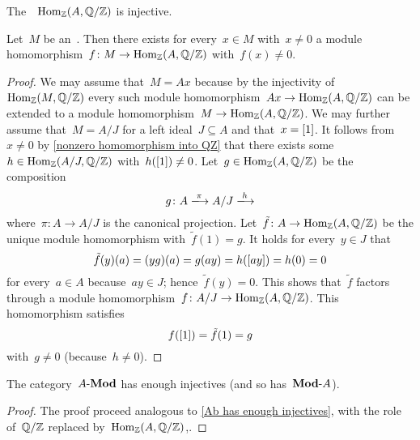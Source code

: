 \begin{example*}
  The~{}~$\operatorname{Hom}_{\mathbb{Z}}(A, \mathbb{Q}/\mathbb{Z})$ is injective.
\end{example*}


\begin{lemma*}
  Let~$M$ be an~{}.
  Then there exists for every~$x \in M$ with~$x \neq 0$ a module homomorphism~$f \colon M \to \operatorname{Hom}_{\mathbb{Z}}(A, \mathbb{Q}/\mathbb{Z})$ with~$f(x) \neq 0$.
\end{lemma*}


\begin{proof}
  We may assume that~$M = A x$ because by the injectivity of~$\operatorname{Hom}_{\mathbb{Z}}(M, \mathbb{Q}/\mathbb{Z})$ every such module homomorphism~$Ax \to \operatorname{Hom}_{\mathbb{Z}}(A, \mathbb{Q}/\mathbb{Z})$ can be extended to a module homomorphism~$M \to \operatorname{Hom}_{\mathbb{Z}}(A, \mathbb{Q}/\mathbb{Z})$.
  We may further assume that~$M = A/J$ for a left ideal~$J \subseteq A$ and that~$x = [1]$.
  It follows from~$x \neq 0$ by \cref{nonzero homomorphism into QZ} that there exists some~$h \in \operatorname{Hom}_{\mathbb{Z}}(A/J, \mathbb{Q}/\mathbb{Z})$ with~$h([1]) \neq 0$.
  Let~$g \in \operatorname{Hom}_{\mathbb{Z}}(A, \mathbb{Q}/\mathbb{Z})$ be the composition
  \[
    g
    \colon
    A
    \xlongto{\pi}
    A/J
    \xlongto{h}
  \]
  where~$\pi \colon A \to A/J$ is the canonical projection.
  Let~$\tilde{f} \colon A \to \operatorname{Hom}_{\mathbb{Z}}(A, \mathbb{Q}/\mathbb{Z})$ be the unique module homomorphism with~$\tilde{f}(1) = g$.
  It holds for every~$y \in J$ that
  \[
    \tilde{f}(y)(a)
    =
    (y g)(a)
    =
    g(ay)
    =
    h([ay])
    =
    h(0)
    =
    0
  \]
  for every~$a \in A$ because~$ay \in J$;
  hence~$\tilde{f}(y) = 0$.
  This shows that~$\tilde{f}$ factors through a {\welldef} module homomorphism~$f \colon A/J \to \operatorname{Hom}_{\mathbb{Z}}(A, \mathbb{Q}/\mathbb{Z})$.
  This homomorphism satisfies
  \[
    f([1])
    =
    \tilde{f}(1)
    =
    g
  \]
  with~$g \neq 0$ (because~$h \neq 0$).
\end{proof}


\begin{corollary}
  The category~$\text{$A$-$\mathbf{Mod}$}$ has enough injectives (and so has~$\text{$\mathbf{Mod}$-$A$}$).
\end{corollary}


\begin{proof}
    The proof proceed analogous to \cref{Ab has enough injectives}, with the role of~$\mathbb{Q}/\mathbb{Z}$ replaced by~$\operatorname{Hom}_{\mathbb{Z}}(A, \mathbb{Q}/\mathbb{Z})$,.
\end{proof}







